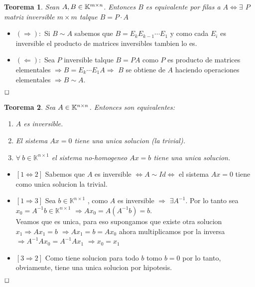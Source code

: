 \documentclass[]{article}
\newtheorem{theorem}{Teorema}
\newenvironment{proof}{\noindent{\bf Prueba:}}{$\hfill \Box$ \vspace{10pt}}
\begin{document}
\begin{theorem}
    Sean $A,B \in\text{$\mathbb{K}^{m \times n}$}$. Entonces $B$ es equivalente por filas a $A \iff \exists$ $P$ matriz inversible
    $m \times m$ talque $B=P \cdot A$  
\end{theorem}
\begin{proof}
    \begin{itemize}
        \item $(\Longrightarrow):$ Si $B \sim A$ sabemos que $B=E_kE_{k-1}\cdots E_1$ y como cada $E_i$ es inversible
        el producto de matrices inversibles tambien lo es.
        \item $(\Longleftarrow):$ Sea $P$ inversible talque $B=PA$ como $P$ es producto de matrices elementales
        $\Longrightarrow B=E_k \cdots E_1 A \Longrightarrow$ $B$ se obtiene de $A$ haciendo operaciones elementales
        $\Longrightarrow B \sim A$.  
    \end{itemize}
\end{proof}

\begin{theorem}
    Sea $A\in\text{$\mathbb{K}^{n \times n}$}$. Entonces son equivalentes: 
    \begin{enumerate}
        \item $A$ es inversible.
        \item El sistema $Ax=0$ tiene una unica solucion (la trivial).
        \item $\forall \: b \in\mathbb{K}^{n\times 1}$ el sistema no-homogeneo $Ax=b$ tiene una unica solucion.
    \end{enumerate}
\end{theorem}
\newpage
\begin{proof}
    \begin{itemize}
        \item $[1 \iff 2]$ Sabemos que $A$ es inversible $\iff A \sim Id \iff$ el sistema $Ax=0$ tiene
        como unica solucion la trivial.
        \item $[1 \Longrightarrow 3]$ Sea $b \in\mathbb{K}^{n\times 1}$ , como $A$ es inversible $\Longrightarrow$
        $\exists A^{-1}$. Por lo tanto sea $x_0= A^{-1}b \in\mathbb{K}^{n\times 1}$ $\Longrightarrow Ax_0=A(A^{-1}b)=b$.\\
        Veamos que es unica, para eso supongamos que existe otra solucion $x_1 \Longrightarrow Ax_1=b$
        $\Longrightarrow Ax_1=b=Ax_0$ ahora multiplicamos por la inversa $\Longrightarrow A^{-1}Ax_0=A^{-1}Ax_1$
        $\Longrightarrow x_0=x_1$
        \item $[3 \Longrightarrow 2]$ Como tiene solucion para todo $b$ tomo $b=0$ por lo tanto, obviamente, tiene una unica
        solucion por hipotesis. 
    \end{itemize}
\end{proof}
\end{document}
